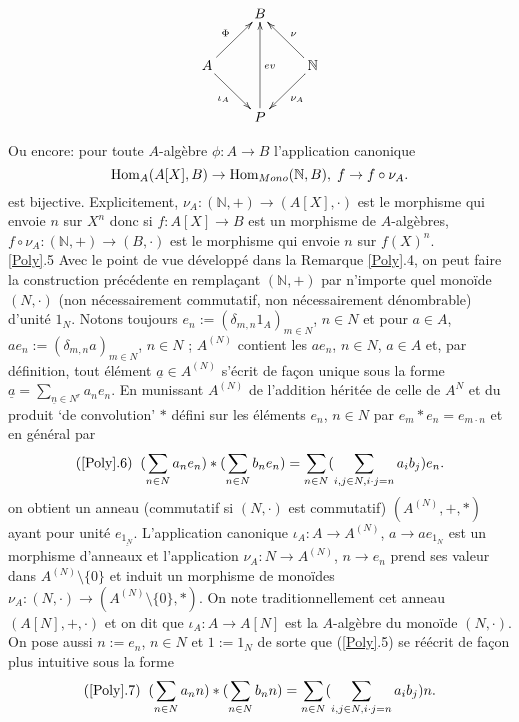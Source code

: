\documentclass[a4paper, oneside, 12pt]{book}
\theoremstyle{definition} %
\newcommand{\N}{\mathbb{N}}
\begin{document}
  $$ \xymatrix{ & B \\ A \ar[ru]^\Phi \ar[rd]_{\iota_A} & & \mathbb{N} \ar[lu]_\nu \ar[ld]^{\nu_A} \\ & P \ar[uu]_{ev} } $$

 Ou encore: pour toute $A$-algèbre $\phi:A\rightarrow B$  l'application canonique
$$\hbox{\rm Hom}_A(A[X],B)\rightarrow \hbox{\rm Hom}_{Mono}(\N,B),\; f\rightarrow f\circ \nu_A.$$
 est bijective. Explicitement, $\nu_A:(\N,+)\rightarrow (A[X],\cdot)$ est le morphisme qui envoie $n$ sur $X^n$ donc si $f:A[X]\rightarrow B$ est un morphisme de $A$-algèbres, $f\circ \nu_A:(\N,+)\rightarrow (B,\cdot)$  est le morphisme qui envoie $n$ sur $f(X)^n$.\\

 
 
  \ref{Poly}.5 Avec le point de vue développé dans la Remarque  \ref{Poly}.4, on peut faire la construction précédente en rempla\c{c}ant $(\N,+)$ par n'importe quel monoïde $(N,\cdot)$ (non nécessairement commutatif, non nécessairement dénombrable) d'unité $1_N$.   Notons toujours $e_{n}:=(\delta_{m,n}1_{A})_{m\in N}$, $n\in N$ et pour $a\in A$, $ae_{n}:=(\delta_{m,n}a)_{m\in  N}$, $n\in N$ ; $A^{(N)}$ contient les $ae_{n}$, $n\in N$, $a\in A$ et, par définition,  tout élément $\underline{a}\in A^{(N)}$ s'écrit de fa\c{c}on unique sous la forme $\underline{a}=\sum_{\underline{n}\in N^r}a_ne_{n}$. En munissant $A^{(N)}$ de l'addition héritée de celle de $A^{N}$ et du produit `de convolution' $*$ défini sur les éléments $e_{n}$, $n\in N$ par 
$e_{m}*e_{n}=e_{m\cdot n} $ et en général par
$$(\ref{Poly}.6)\;\; (\sum_{n\in N}a_{n}e_{n}) *(\sum_{n\in N}b_{n}e_{n})=\sum_{n\in N}(\sum_{i,j\in N,i\cdot j=n}a_{i}b_{j})e_{n}.$$
on obtient un anneau (commutatif si $(N,\cdot)$ est commutatif) $(A^{(N)},+,*)$  ayant pour unité $e_{\underline{1_N}}$. L'application canonique $\iota_A:A\rightarrow A^{(N)}$, $a\rightarrow ae_{1_N}  $  est un morphisme d'anneaux et l'application $\nu_A:N\rightarrow A^{(N)}$, $n\rightarrow e_n$ prend ses valeur dans $A^{(N)}\setminus\lbrace 0\rbrace$ et induit un morphisme de monoïdes $\nu_A:(N,\cdot)\rightarrow (A^{(N)}\setminus\lbrace 0\rbrace,*)$.
 On note traditionnellement cet anneau $(A[N],+,\cdot) $ et on dit que $\iota_A:A\rightarrow A[N]$ est la $A$-algèbre du monoïde $(N,\cdot)$. On pose aussi $n:=e_{n}$, $n\in N$    et $1:=1_N$ de sorte que (\ref{Poly}.5) se réécrit de fa\c{c}on plus intuitive sous la forme
 $$(\ref{Poly}.7)\;\; (\sum_{n\in N}a_{n}n) *(\sum_{n\in N}b_{n}n)=\sum_{n\in N}(\sum_{i,j\in N,i\cdot j=n}a_{i}b_{j})n.$$
\end{document}
